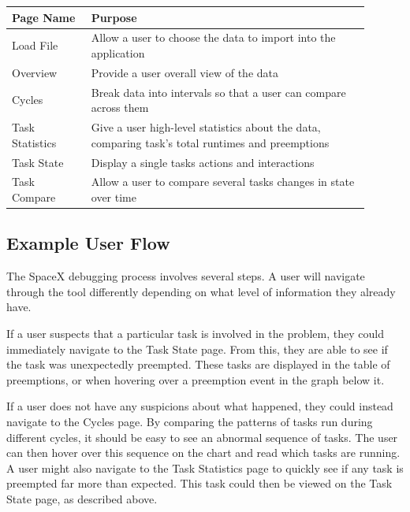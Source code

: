 \documentclass{hmcclinic}
\begin{document}
  \begin{center}
    \begin{tabular}{p{0.2\linewidth}p{0.7\linewidth}}
     \toprule
      Page Name       & Purpose\\
      \midrule
      Load File       & Allow a user to choose the data to import into the
      application\\
      Overview        & Provide a user overall view of the data\\
      Cycles          & Break data into intervals so that a user can compare
      across them\\
      Task Statistics & Give a user high-level statistics about the data,
      comparing task's total runtimes and preemptions\\
      Task State      & Display a single tasks actions and interactions\\
      Task Compare    & Allow a user to compare several tasks changes in state
      over time\\
    \bottomrule
    \end{tabular}
  \end{center}
\subsection{Example User Flow}
  The SpaceX debugging process involves several steps.  A user will navigate
  through the tool differently depending on what level of information they
  already have.

  If a user suspects that a particular task is involved in the problem, they
  could immediately navigate to the Task State page. From this, they are able to
  see if the task was unexpectedly preempted. These tasks are displayed in the
  table of preemptions, or when hovering over a preemption event in the graph
  below it.

  If a user does not have any suspicions about what happened, they could instead
  navigate to the Cycles page. By comparing the patterns of tasks run during
  different cycles, it should be easy to see an abnormal sequence of tasks. The
  user can then hover over this sequence on the chart and read which tasks are
  running. A user might also navigate to the Task Statistics page to quickly see
  if any task is preempted far more than expected. This task could then be
  viewed on the Task State page, as described above.

%
\end{document}

